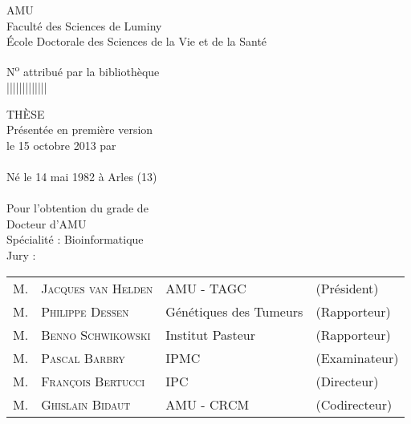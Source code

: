 \thispagestyle{empty}
  \begin{center}
    \avantgarLarge \acl{AMU}\\[1ex]
    \avantgar Faculté des Sciences de Luminy\\[1ex]
    \avantgar École Doctorale des Sciences de la Vie et de la Santé\\[3ex]
  \end{center}

  \begin{flushright}
    \avantgar N\textsuperscript{o} attribué par la bibliothèque\\[1ex]
    \avantgar |\textunderscore|\textunderscore|\textunderscore|\textunderscore|\textunderscore|\textunderscore|\textunderscore|\textunderscore|\textunderscore|\textunderscore|\textunderscore|\textunderscore|\\[1ex]
  \end{flushright}

  \begin{center}
    \avantgarboldHuge THÈSE\\[1.5ex]

    \avantgarlarge Présentée en première version\\[1ex]
    \avantgarlarge le 15 octobre 2013 par\\[1ex]
    \avantgarLarge \myauthor\\[1ex]
    \avantgar Né le 14 mai 1982 à Arles (13)\\[5ex]

    \avantgarboldHuge \mytitlefr\\[2ex]

    \avantgarlarge Pour l'obtention du grade de\\[1ex]
    \avantgarLarge Docteur d'\acl{AMU}\\[1ex]
    \avantgarlarge Spécialité : Bioinformatique\\[5ex]

    \avantgarlarge Jury :\\[1ex]
    \begin{tabular}{llll}
      {\Large M.} & {\Large\textsc{Jacques van Helden}}  & {\large \acs{AMU} - \acs{TAGC}}  & {\large(Président)}   \\
      {\Large M.} & {\Large\textsc{Philippe Dessen}}     & {\large Génétiques des Tumeurs}  & {\large(Rapporteur)}  \\
      {\Large M.} & {\Large\textsc{Benno Schwikowski}}   & {\large Institut Pasteur}        & {\large(Rapporteur)}  \\
      {\Large M.} & {\Large\textsc{Pascal Barbry}}       & {\large \acs{IPMC}}              & {\large(Examinateur)} \\
      {\Large M.} & {\Large\textsc{François Bertucci}}   & {\large \acs{IPC}}               & {\large(Directeur)}   \\
      {\Large M.} & {\Large\textsc{Ghislain Bidaut}}     & {\large \acs{AMU} - \acs{CRCM}}  & {\large(Codirecteur)} \\
    \end{tabular}
  \end{center}